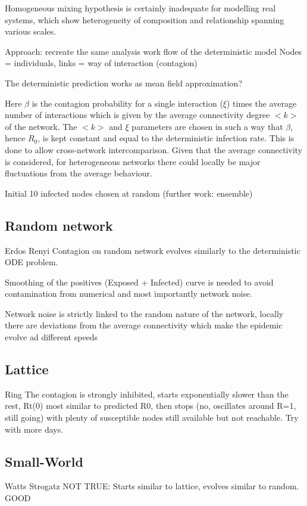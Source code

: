 \documentclass[DIV=12, BCOR=0pt]{scrartcl}  %
\begin{document}
  Homogeneous mixing hypothesis is certainly inadequate for modelling real systems, which show heterogeneity of composition and relationship spanning various scales. 
  
  
  
  
  Approach: recreate the same analysis work flow of the deterministic model
  Nodes = individuals, links = way of interaction (contagion)
  
  The deterministic prediction works as mean field approximation?
  
  Here $\beta$ is the contagion probability for a single interaction ($\xi$) times the average number of interactions which is given by the average connectivity degree $<k>$ of the network. The $<k>$ and $\xi$ parameters are chosen in such a way that $\beta$, hence $R_0$, is kept constant and equal to the deterministic infection rate. This is done to allow cross-network intercomparison. Given that the average connectivity is considered, for heterogeneous networks there could locally be major fluctuations from the average behaviour.
  
  
  Initial 10 infected nodes chosen at random (further work: ensemble)
  
  \subsection{Random network}
  Erdos Renyi
  Contagion on random network evolves similarly to the deterministic ODE problem. 
  
  Smoothing of the positives (Exposed + Infected) curve is needed to avoid contamination from numerical and most importantly network noise. 
  
  Network noise is strictly linked to the random nature of the network, locally there are deviations from the average connectivity which make the epidemic evolve ad different speeds
  
  
  \subsection{Lattice}
  Ring
  The contagion is strongly inhibited, starts exponentially slower than the rest, Rt(0) most similar to predicted R0,
  then stops (no, oscillates around R=1, still going) with plenty of susceptible nodes still available but not reachable. Try with more days.
  
  
  \subsection{Small-World}
  Watts Strogatz
  NOT TRUE: Starts similar to lattice, evolves similar to random. GOOD
  
\end{document}
